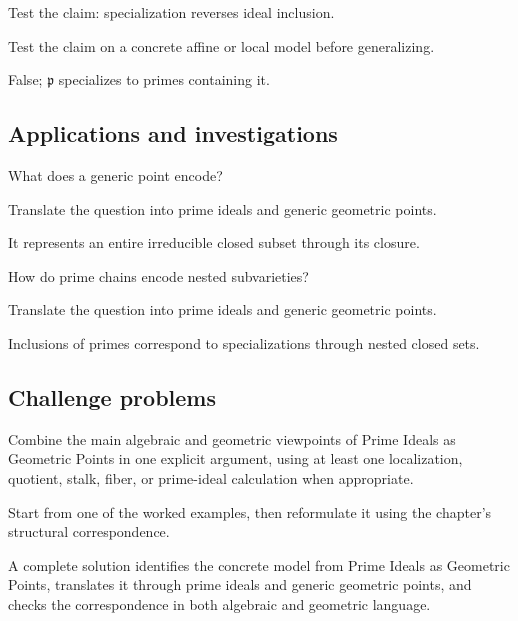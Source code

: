 \begin{exercise}\label{exr:vi06-expand-12}
Test the claim: specialization reverses ideal inclusion.
\end{exercise}
\begin{hint}
Test the claim on a concrete affine or local model before generalizing.
\end{hint}
\begin{solution}
False; $\mathfrak p$ specializes to primes containing it.
\end{solution}

\subsection*{Applications and investigations}

\begin{exercise}\label{exr:vi06-expand-13}
What does a generic point encode?
\end{exercise}
\begin{hint}
Translate the question into prime ideals and generic geometric points.
\end{hint}
\begin{solution}
It represents an entire irreducible closed subset through its closure.
\end{solution}

\begin{exercise}\label{exr:vi06-expand-14}
How do prime chains encode nested subvarieties?
\end{exercise}
\begin{hint}
Translate the question into prime ideals and generic geometric points.
\end{hint}
\begin{solution}
Inclusions of primes correspond to specializations through nested closed sets.
\end{solution}

\subsection*{Challenge problems}

\begin{exercise}\label{exr:vi06-expand-15}
Combine the main algebraic and geometric viewpoints of Prime Ideals as Geometric Points in one explicit argument, using at least one localization, quotient, stalk, fiber, or prime-ideal calculation when appropriate.
\end{exercise}
\begin{hint}
Start from one of the worked examples, then reformulate it using the chapter's structural correspondence.
\end{hint}
\begin{solution}
A complete solution identifies the concrete model from Prime Ideals as Geometric Points, translates it through prime ideals and generic geometric points, and checks the correspondence in both algebraic and geometric language.
\end{solution}

